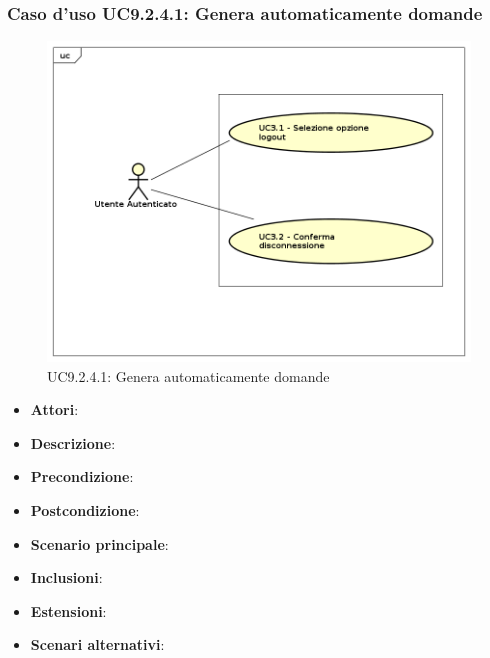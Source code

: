 			\subsubsection{Caso d'uso UC9.2.4.1: Genera automaticamente domande}
			\label{UC9.2.4.1}
			\begin{figure}[h]
				\centering
			\includegraphics[scale=0.7,keepaspectratio]{UML/UC9.png}
				\caption{UC9.2.4.1: Genera automaticamente domande}
			\end{figure}
			\FloatBarrier
			\begin{itemize}
				\item \textbf{Attori}: 
				\item \textbf{Descrizione}: 
				\item \textbf{Precondizione}: 
				\item \textbf{Postcondizione}: 
				\item \textbf{Scenario principale}:
				\item \textbf{Inclusioni}:
				\item \textbf{Estensioni}:
				\item \textbf{Scenari alternativi}:
			\end{itemize}
			
